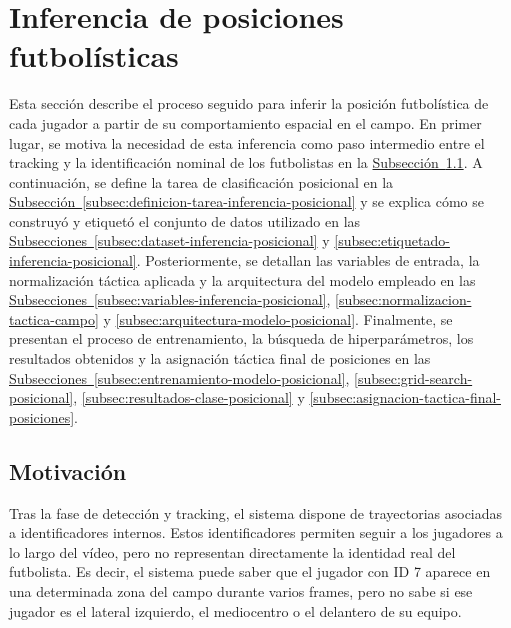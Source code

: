 \section{Inferencia de posiciones futbolísticas}
\label{sec:clasificacion-posicional}

Esta sección describe el proceso seguido para inferir la posición futbolística de cada jugador a partir de su comportamiento espacial en el campo. En primer lugar, se motiva la necesidad de esta inferencia como paso intermedio entre el tracking y la identificación nominal de los futbolistas en la \hyperref[subsec:motivacion-inferencia-posicional]{Subsección~\ref*{subsec:motivacion-inferencia-posicional}}. A continuación, se define la tarea de clasificación posicional en la \hyperref[subsec:definicion-tarea-inferencia-posicional]{Subsección~\ref*{subsec:definicion-tarea-inferencia-posicional}} y se explica cómo se construyó y etiquetó el conjunto de datos utilizado en las \hyperref[subsec:dataset-inferencia-posicional]{Subsecciones~\ref*{subsec:dataset-inferencia-posicional}} y \hyperref[subsec:etiquetado-inferencia-posicional]{\ref*{subsec:etiquetado-inferencia-posicional}}. Posteriormente, se detallan las variables de entrada, la normalización táctica aplicada y la arquitectura del modelo empleado en las \hyperref[subsec:variables-inferencia-posicional]{Subsecciones~\ref*{subsec:variables-inferencia-posicional}}, \hyperref[subsec:normalizacion-tactica-campo]{\ref*{subsec:normalizacion-tactica-campo}} y \hyperref[subsec:arquitectura-modelo-posicional]{\ref*{subsec:arquitectura-modelo-posicional}}. Finalmente, se presentan el proceso de entrenamiento, la búsqueda de hiperparámetros, los resultados obtenidos y la asignación táctica final de posiciones en las \hyperref[subsec:entrenamiento-modelo-posicional]{Subsecciones~\ref*{subsec:entrenamiento-modelo-posicional}}, \hyperref[subsec:grid-search-posicional]{\ref*{subsec:grid-search-posicional}}, \hyperref[subsec:resultados-clase-posicional]{\ref*{subsec:resultados-clase-posicional}} y \hyperref[subsec:asignacion-tactica-final-posiciones]{\ref*{subsec:asignacion-tactica-final-posiciones}}.

\subsection{Motivación}
\label{subsec:motivacion-inferencia-posicional}

Tras la fase de detección y tracking, el sistema dispone de trayectorias asociadas a identificadores internos. Estos identificadores permiten seguir a los jugadores a lo largo del vídeo, pero no representan directamente la identidad real del futbolista. Es decir, el sistema puede saber que el jugador con ID 7 aparece en una determinada zona del campo durante varios frames, pero no sabe si ese jugador es el lateral izquierdo, el mediocentro o el delantero de su equipo.

